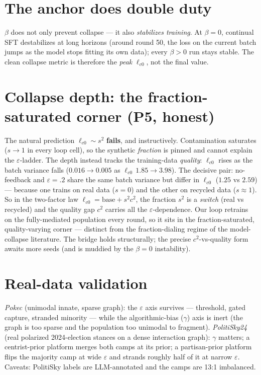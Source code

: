 \documentclass[11pt]{article}
\begin{document}
\section{The anchor does double duty}
$\beta$ does not only prevent collapse --- it also \emph{stabilizes training}. At
$\beta=0$, continual SFT destabilizes at long horizons (around round 50, the loss on the
current batch jumps as the model stops fitting its own data); every $\beta>0$ run stays
stable. The clean collapse metric is therefore the \emph{peak} $\ell_{c0}$, not the
final value.

\section{Collapse depth: the fraction-saturated corner (P5, honest)}
The natural prediction $\ell_{c0}\sim s^2$ \textbf{fails}, and instructively. Contamination
saturates ($s\to1$ in every loop cell), so the synthetic \emph{fraction} is pinned and
cannot explain the $\varepsilon$-ladder. The depth instead tracks the training-data
\emph{quality}: $\ell_{c0}$ rises as the batch variance falls
($0.016\to0.005$ as $\ell_{c0}\,1.85\to3.98$). The decisive pair: no-feedback and
$\varepsilon{=}.2$ share the same batch variance but differ in $\ell_{c0}$ ($1.25$ vs
$2.59$) --- because one trains on real data ($s=0$) and the other on recycled data
($s\approx1$). So in the two-factor law $\ell_{c0}=\text{base}+s^2 c^2$, the fraction
$s^2$ is a \emph{switch} (real vs recycled) and the quality gap $c^2$ carries all the
$\varepsilon$-dependence. Our loop retrains on the fully-mediated population every round,
so it sits in the fraction-saturated, quality-varying corner --- distinct from the
fraction-dialing regime of the model-collapse literature. The bridge holds structurally;
the precise $c^2$-vs-quality form awaits more seeds (and is muddied by the $\beta=0$
instability).

\section{Real-data validation}
\emph{Pokec} (unimodal innate, sparse graph): the $\varepsilon$ axis survives ---
threshold, gated capture, stranded minority --- while the algorithmic-bias ($\gamma$)
axis is inert (the graph is too sparse and the population too unimodal to fragment).
\emph{PolitiSky24} (real polarized 2024-election stances on a dense interaction graph):
$\gamma$ matters; a centrist-prior platform merges both camps at its prior; a
partisan-prior platform flips the majority camp at wide $\varepsilon$ and strands roughly
half of it at narrow $\varepsilon$. Caveats: PolitiSky labels are LLM-annotated and the
camps are 13:1 imbalanced.
\end{document}
